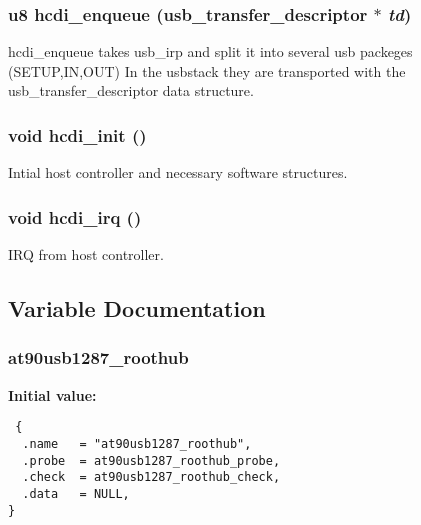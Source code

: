 \subsubsection{\setlength{\rightskip}{0pt plus 5cm}u8 hcdi\_\-enqueue ({\bf usb\_\-transfer\_\-descriptor} $\ast$ {\em td})}\label{at90usb1287-hcd_8c_156486d5382dea364107d54250a29795}


hcdi\_\-enqueue takes usb\_\-irp and split it into several usb packeges (SETUP,IN,OUT) In the usbstack they are transported with the usb\_\-transfer\_\-descriptor data structure. 
\subsubsection{\setlength{\rightskip}{0pt plus 5cm}void hcdi\_\-init ()}\label{at90usb1287-hcd_8c_a5e728976c2dc39c8374ddbea42e9864}


Intial host controller and necessary software structures. 
\subsubsection{\setlength{\rightskip}{0pt plus 5cm}void hcdi\_\-irq ()}\label{at90usb1287-hcd_8c_68ce1031b8a7a610ec829f164d6f33cd}


IRQ from host controller. 

\subsection{Variable Documentation}
\subsubsection{ {\bf at90usb1287\_\-roothub}}\label{at90usb1287-hcd_8c_4ee608227528ece23c06ed0cea3e5d5d}


\textbf{Initial value:}

\begin{Code}\begin{verbatim} {
  .name   = "at90usb1287_roothub",
  .probe  = at90usb1287_roothub_probe,
  .check  = at90usb1287_roothub_check,
  .data   = NULL,
}
\end{verbatim}\end{Code}
